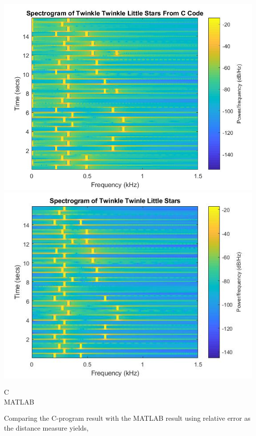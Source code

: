 \documentclass{article}
\begin{document}
        \begin{center}
            \includegraphics[scale=0.2]{task7.jpg}
            \includegraphics[scale=0.3]{task4b.jpg}
        \end{center}
        \begin{multicols}{2}
            \begin{center}
                C\\
                \columnbreak
                MATLAB
            \end{center}
        \end{multicols}
        Comparing the C-program result with the MATLAB result using relative error as the distance measure yields,
        \begin{center}
        \end{center}
\end{document}
